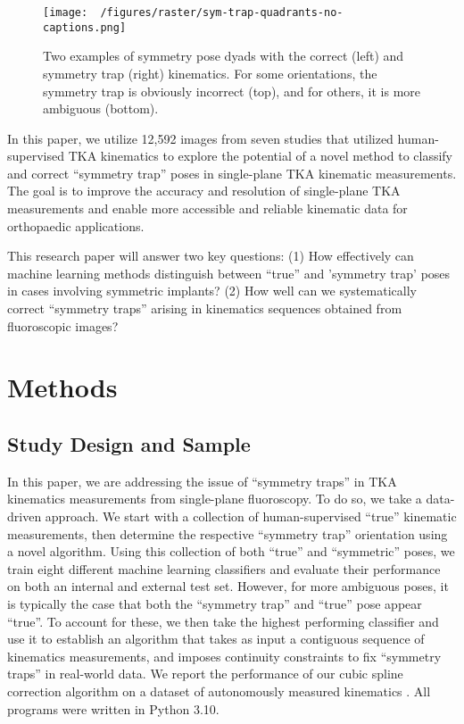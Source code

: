 {\begin{figure}[h!]
	\centering
	\texttt{[image: ~/figures/raster/sym-trap-quadrants-no-captions.png]}
	\caption[Two examples of symmetric tibial poses]{Two examples of symmetry pose dyads with the correct (left) and symmetry trap (right) kinematics. For some orientations, the symmetry trap is obviously incorrect (top), and for others, it is more ambiguous (bottom).}
	\label{fig:symmetry-trap-quadrants}
\end{figure}


In this paper, we utilize 12,592 images from seven studies that utilized human-supervised TKA kinematics \cite{jennyRegistrationKneeKinematics2015,kefalaAssessmentKneeKinematics2017,okamotoVivoKneeKinematics2011,palm-vlasakMinimalVariationTop2022,scottCanTotalKnee2016,watanabeKneeKinematicsAnterior2013,watanabeInvivoKinematicsHighflex2016} to explore the potential of a novel method to classify and correct ``symmetry trap'' poses in single-plane TKA kinematic measurements.
The goal is to improve the accuracy and resolution of single-plane TKA measurements and enable more accessible and reliable kinematic data for orthopaedic applications.

This research paper will answer two key questions:  (1) How effectively can machine learning methods distinguish between ``true'' and 'symmetry trap' poses in cases involving symmetric implants? (2) How well can we systematically correct ``symmetry traps'' arising in kinematics sequences obtained from fluoroscopic images?

\section{Methods}
\subsection{Study Design and Sample}
In this paper, we are addressing the issue of “symmetry traps” in TKA kinematics measurements from single-plane fluoroscopy.
To do so, we take a data-driven approach.
We start with a collection of human-supervised “true” kinematic measurements, then determine the respective “symmetry trap” orientation using a novel algorithm.
Using this collection of both “true” and “symmetric” poses, we train eight different machine learning classifiers and evaluate their performance on both an internal and external test set.
However, for more ambiguous poses, it is typically the case that both the “symmetry trap” and “true” pose appear “true”.
To account for these, we then take the highest performing classifier and use it to establish an algorithm that takes as input a contiguous sequence of kinematics measurements, and imposes continuity constraints to fix “symmetry traps” in real-world data.
We report the performance of our cubic spline correction algorithm on a dataset of autonomously measured kinematics \cite{jensenJointTrackMachine2023}.
All programs were written in Python 3.10.

}
